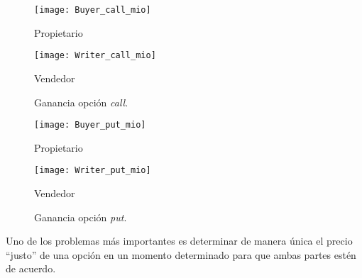 \begin{figure}[h!]\label{graphCall}
	
	\begin{minipage}{0.5\textwidth}
		\centering
		\texttt{[image: Buyer\_call\_mio]} 
		\caption*{Propietario}
	\end{minipage}
	\begin{minipage}{0.5\textwidth}
		\texttt{[image: Writer\_call\_mio]}
		\caption*{Vendedor}
		
	\end{minipage}
	
	\caption{Ganancia opción \textit{call}.}
\end{figure}

\begin{figure}[h!]\label{graphPut}
	
	\begin{minipage}{0.5\textwidth}
		\centering
		\texttt{[image: Buyer\_put\_mio]} 
		\caption*{Propietario}
	\end{minipage}
	\begin{minipage}{0.5\textwidth}
		\texttt{[image: Writer\_put\_mio]}
		\caption*{Vendedor}
		
	\end{minipage}
	
	\caption{Ganancia opción \textit{put}.}
\end{figure} 
Uno de los problemas más importantes es determinar de manera única el precio ``justo'' de una opción en un momento determinado para que ambas partes estén de acuerdo.\\


